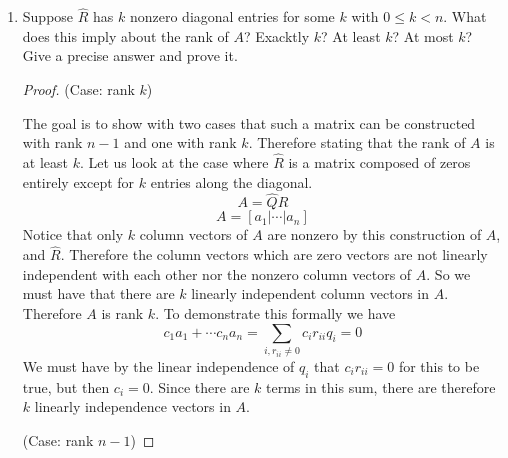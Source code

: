 \documentclass{article}
\begin{document}
\begin{enumerate}
\begin{enumerate}
\begin{proof}
\end{proof}

\item Suppose $\hat{R}$ has $k$ nonzero diagonal entries for some $k$ with $0 \le k < n$. What does this imply about the rank of $A$? Exacktly $k$? At least $k$? At most $k$? Give a precise answer and prove it.

    \begin{proof}

    (Case: rank $k$) 

    The goal is to show with two cases that such a matrix can be constructed with rank $n-1$ and one with rank $k$. Therefore stating that the rank of $A$ is at least $k$.  
    Let us look at the case where $\hat{R}$ is a matrix composed of zeros entirely except for $k$ entries along the diagonal.
    \[
        A = \hat{Q}\hat{R}
    \]
    \[
        A = \left[ a_1 \Big | \cdots \Big | a_n \right]
    \]
    Notice that only $k$ column vectors of $A$ are nonzero by this construction of $A$, and $\hat{R}$. Therefore the column vectors which are zero vectors are not linearly independent with each other nor the nonzero column vectors of $A$. So we must have that there are $k$ linearly independent column vectors in $A$. Therefore $A$ is rank $k$. To demonstrate this formally we have
    \[
        c_1a_1 + \cdots c_na_n = \sum_{i, r_{ii} \neq 0} c_ir_{ii}q_i = 0
    \]
    We must have by the linear independence of $q_i$ that $c_ir_{ii} = 0$ for this to be true, but then $c_i = 0$. Since there are $k$ terms in this sum, there are therefore $k$ linearly independence vectors in $A$. 

    (Case: rank $n-1$)


\end{proof}
\end{enumerate}
\end{enumerate}
\end{document}
